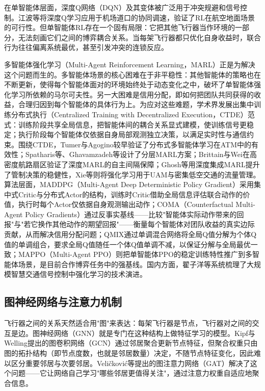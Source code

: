 \documentclass[12pt,a4paper,UTF8]{ctexart}
\begin{document}
在单智能体层面，深度Q网络（DQN）\cite{ref40}及其变体被广泛用于冲突规避和信号控制\cite{ref12,ref15,ref16,ref17,ref18,ref19,ref20,ref21,ref22}。江波等\cite{ref21}将深度Q学习应用于机场道口的协同调速，验证了RL在航空地面场景的可行性。但单智能体RL存在一个固有局限：它把其他飞行器当作环境的一部分，无法刻画它们之间的博弈耦合关系。当每架飞行器都只优化自身收益时，联合行为往往偏离系统最优，甚至引发冲突的连锁反应。

多智能体强化学习（Multi-Agent Reinforcement Learning，MARL）正是为解决这个问题而生的。多智能体场景的核心困难在于非平稳性：其他智能体的策略也在不断更新，使得每个智能体面对的环境始终处于动态变化之中，破坏了单智能体强化学习所依赖的马尔可夫性。另一大困难是信用分配，即如何把团队共同获得的收益，合理归因到每个智能体的具体行为上。为应对这些难题，学术界发展出集中训练分布式执行（Centralized Training with Decentralized Execution，CTDE）范式：训练阶段共享全局信息，把智能体间的耦合关系显式建模，使训练信号更稳定；执行阶段每个智能体仅依据自身局部观测独立决策，以满足实时性与通信约束。围绕CTDE，Tumer与Agogino\cite{ref6,ref7,ref14,ref24}较早验证了分布式多智能体学习在ATM中的有效性；Spatharis等\cite{ref11}、Ghavamzadeh等\cite{ref23}设计了分层MARL方案；Brittain与Wei\cite{ref8}在高密度航路扇区验证了深度MARL的自主间隔保障；Ghosh等\cite{ref9}用深度集成MARL提升了管制决策的稳健性，Xie等\cite{ref29}则将强化学习用于UAM与密集低空交通的流量管理。算法层面，MADDPG（Multi-Agent Deep Deterministic Policy Gradient）\cite{ref34}采用集中式Critic与分布式Actor的结构，训练时Critic借助全局信息评估联合动作的价值，执行时每个Actor仅依据自身观测输出动作；COMA（Counterfactual Multi-Agent Policy Gradients）\cite{ref35}通过反事实基线——比较"智能体实际动作带来的回报"与"若它换作其他动作的期望回报"——衡量每个智能体对团队收益的真实边际贡献，从而解决信用分配问题；QMIX\cite{ref33}通过单调混合网络将全局Q值分解为个体Q值的单调组合，要求全局Q值随任一个体Q值单调不减，以保证分解与全局最优一致；MAPPO（Multi-Agent PPO）\cite{ref36}则把单智能体PPO的稳定训练特性推广到多智能体场景，是目前合作博弈任务中的强基线。国内方面，翟子洋等\cite{ref13}系统梳理了大规模智慧交通信号控制中强化学习的技术演进。

\subsection{图神经网络与注意力机制}

飞行器之间的关系天然适合用"图"来表达：每架飞行器是节点，飞行器对之间的交互是边。图神经网络（GNN）就是专门在这种结构上做特征学习的模型。Kipf与Welling\cite{ref32}提出的图卷积网络（GCN）通过邻居聚合更新节点特征，但聚合权重只由图的拓扑结构（即节点度数，也就是邻居数量）决定，不随节点特征变化，因此难以区分重要邻居与次要邻居。Veličković等\cite{ref31}提出的图注意力网络（GAT）解决了这个问题——它让网络自己学习"哪些邻居更值得关注"，通过注意力权重自适应地聚合信息。
\end{document}
